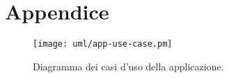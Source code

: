 \section*{Appendice}
\label{sec:appendix}

\begin{figure}[H]
    \centering
    \texttt{[image: uml/app-use-case.pm]}
    \caption{Diagramma dei casi d'uso della applicazione.}
    \label{fig:app-use-case}
\end{figure}

